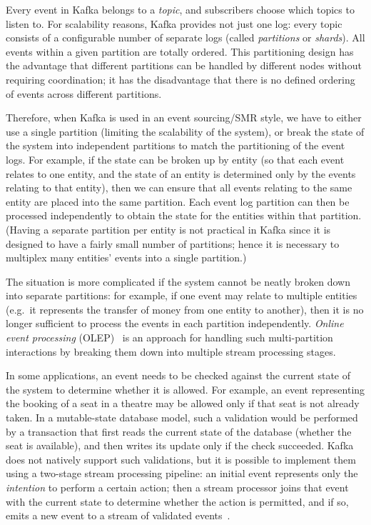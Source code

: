 \documentclass[sigconf]{acmart}
\begin{document}
Every event in Kafka belongs to a \emph{topic}, and subscribers choose which topics to listen to.
For scalability reasons, Kafka provides not just one log: every topic consists of a configurable number of separate logs (called \emph{partitions} or \emph{shards}).
All events within a given partition are totally ordered.
This partitioning design has the advantage that different partitions can be handled by different nodes without requiring coordination; it has the disadvantage that there is no defined ordering of events across different partitions.

Therefore, when Kafka is used in an event sourcing/SMR style, we have to either use a single partition (limiting the scalability of the system), or break the state of the system into independent partitions to match the partitioning of the event logs.
For example, if the state can be broken up by entity (so that each event relates to one entity, and the state of an entity is determined only by the events relating to that entity), then we can ensure that all events relating to the same entity are placed into the same partition.
Each event log partition can then be processed independently to obtain the state for the entities within that partition.
(Having a separate partition per entity is not practical in Kafka since it is designed to have a fairly small number of partitions; hence it is necessary to multiplex many entities' events into a single partition.)

The situation is more complicated if the system cannot be neatly broken down into separate partitions: for example, if one event may relate to multiple entities (e.g.\ it represents the transfer of money from one entity to another), then it is no longer sufficient to process the events in each partition independently.
\emph{Online event processing} (OLEP)~\cite{Kleppmann:2019olep} is an approach for handling such multi-partition interactions by breaking them down into multiple stream processing stages.

In some applications, an event needs to be checked against the current state of the system to determine whether it is allowed.
For example, an event representing the booking of a seat in a theatre may be allowed only if that seat is not already taken.
In a mutable-state database model, such a validation would be performed by a transaction that first reads the current state of the database (whether the seat is available), and then writes its update only if the check succeeded.
Kafka does not natively support such validations, but it is possible to implement them using a two-stage stream processing pipeline: an initial event represents only the \emph{intention} to perform a certain action; then a stream processor joins that event with the current state to determine whether the action is permitted, and if so, emits a new event to a stream of validated events~\cite{Kleppmann:2019olep}.
\end{document}
